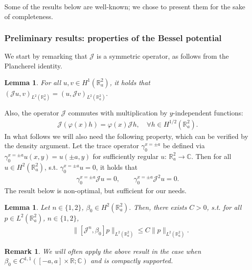 \documentclass[report]{elsarticle}
\newtheorem{lemma}[theorem]{Lemma}
\newtheorem{remark}[theorem]{Remark}
\numberwithin{theorem}{section}
\begin{document}
Some of the results below are well-known; we chose to present them for the sake of completeness.
\subsubsection{Preliminary results: properties of the Bessel potential}
We start by remarking that $\mathcal{J}$ is a symmetric operator, as follows from the Plancherel identity. 
\begin{lemma}
	\label{lem:plancherel}
	For all $u, v\in H^1(\mathbb{R}^2_a)$, it holds that $
		(\mathcal{J}u,v)_{L^2(\mathbb{R}^2_a)}=(u,\mathcal{J}v)_{L^2(\mathbb{R}^2_a)}.	$
\end{lemma}
Also, the operator $\mathcal{J}$ commutes with multiplication by $y$-independent functions:
\begin{align*}
	\mathcal{J}(\varphi(x)h)=\varphi(x)\mathcal{J}h,\quad \forall h\in H^{1/2}(\mathbb{R}^{2}_a). 
\end{align*}
In what follows we will also need the following property, which can be verified by the density argument. 
Let the trace operator $\gamma_0^{x=\pm a}$ be defined via $\gamma_0^{x=\pm a}u(x,y)=u(\pm a, y)$ for sufficiently regular $u:\,\mathbb{R}^2_a\rightarrow \mathbb{C}$. Then for all $u\in H^2(\mathbb{R}^2_a)$, s.t. $\gamma_0^{x=\pm a}u=0$, it holds that
\begin{align}
	\label{eq:zero_trace}
	\gamma_0^{x=\pm a} \mathcal{J} u=0,\qquad \gamma_0^{x=\pm a} \mathcal{J}^2 u=0.
\end{align}
The result below is non-optimal, but sufficient for our needs.
\begin{lemma}
	\label{lem:commutator}
	Let $n\in \{1,2\}$, $\beta_0\in H^{2}(\mathbb{R}^2_a)$. Then, there exists $C>0$, s.t. for all $p\in L^2(\mathbb{R}_a^2)$, $n\in \{1,2\}$,
	\begin{align*}
		&\|[\mathcal{J}^n,\beta_0]p\|_{L^2(\mathbb{R}^2_a)}\leq C \|p\|_{L^2(\mathbb{R}^2_a)}.
	\end{align*}
\end{lemma}
\begin{remark}
	\label{rem:regularity}
We will often apply the above result in the case when $\beta_0\in C^{1,1}([-a,a]\times\mathbb{R}; \mathbb{C})$ and is compactly supported.
\end{remark}
\end{document}
